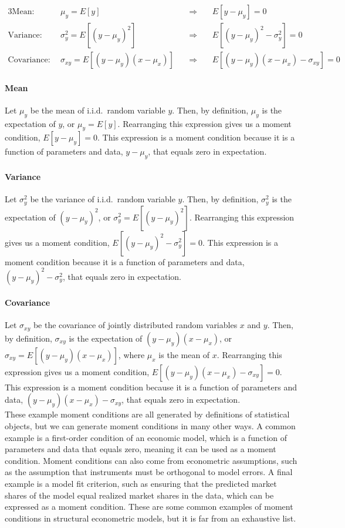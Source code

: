 \documentclass[11pt,letterpaper]{article}
\begin{document}
\begin{alignat*}{3}
	\text{Mean:} ~~ & \mu_y = E[y] ~ && \Rightarrow ~ & &E[y - \mu_y] = 0 \\
	\text{Variance:} ~~ & \sigma_y^2 = E[(y - \mu_y)^2] ~ && \Rightarrow ~ && E[ (y - \mu_y)^2 - \sigma_y^2] = 0 \\
	\text{Covariance:} ~~ & \sigma_{xy} = E[(y - \mu_y) (x - \mu_x)] ~ && \Rightarrow ~ && E[ (y - \mu_y) (x - \mu_x) - \sigma_{xy}] = 0
\end{alignat*}

\paragraph{Mean} Let $\mu_y$ be the mean of i.i.d.\ random variable $y$. Then, by definition, $\mu_y$ is the expectation of $y$, or $\mu_y = E[y]$. Rearranging this expression gives us a moment condition, $E[y - \mu_y] = 0$. This expression is a moment condition because it is a function of parameters and data, $y - \mu_y$, that equals zero in expectation.

\paragraph{Variance} Let $\sigma_y^2$ be the variance of i.i.d.\ random variable $y$. Then, by definition, $\sigma_y^2$ is the expectation of $(y - \mu_y)^2$, or $\sigma_y^2 = E[(y - \mu_y)^2]$. Rearranging this expression gives us a moment condition, $E[(y - \mu_y)^2 - \sigma_y^2] = 0$. This expression is a moment condition because it is a function of parameters and data, $(y - \mu_y)^2 - \sigma_y^2$, that equals zero in expectation.

\paragraph{Covariance} Let $\sigma_{xy}$ be the covariance of jointly distributed random variables $x$ and $y$. Then, by definition, $\sigma_{xy}$ is the expectation of $(y - \mu_y) (x - \mu_x)$, or $\sigma_{xy} = E[(y - \mu_y) (x - \mu_x)]$, where $\mu_x$ is the mean of $x$. Rearranging this expression gives us a moment condition, $E[(y - \mu_y) (x - \mu_x) - \sigma_{xy}] = 0$. This expression is a moment condition because it is a function of parameters and data, $(y - \mu_y) (x - \mu_x) - \sigma_{xy}$, that equals zero in expectation. \\

\noindent These example moment conditions are all generated by definitions of statistical objects, but we can generate moment conditions in many other ways. A common example is a first-order condition of an economic model, which is a function of parameters and data that equals zero, meaning it can be used as a moment condition. Moment conditions can also come from econometric assumptions, such as the assumption that instruments must be orthogonal to model errors. A final example is a model fit criterion, such as ensuring that the predicted market shares of the model equal realized market shares in the data, which can be expressed as a moment condition. These are some common examples of moment conditions in structural econometric models, but it is far from an exhaustive list.
\end{document}
